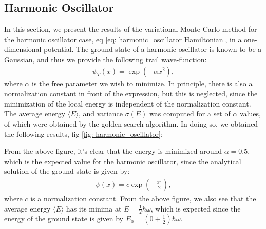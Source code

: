\documentclass[a4paper]{article}
\newcommand{\w}{\omega}
\newcommand{\average}[1]{\langle #1 \rangle}
\begin{document}
\subsection{Harmonic Oscillator}
In this section, we present the results of the variational Monte Carlo method for the harmonic oscillator case, eq \ref{eq: harmonic_oscillator Hamiltonian}, in a one-dimensional potential.
The ground state of a harmonic oscillator is known to be a Gaussian, and thus we provide the following trail wave-function:
\begin{align*}
    \psi_T(x) = \exp\left(-\alpha x^2\right),
\end{align*}where $\alpha$ is the free parameter we wish to minimize.
In principle, there is also a normalization constant in front of the expression, but this is neglected, since the minimization of the local energy is independent of the normalization constant.
The average energy $\average{E}$, and variance $\sigma(E)$ was computed for a set of $\alpha$ values, of which were obtained by the golden search algorithm.
In doing so, we obtained the following results, fig \ref{fig: harmonic_oscillator}:
\begin{figure}[H]
    \centering
\end{figure}\noindent
From the above figure, it's clear that the energy is minimized around $\alpha = 0.5$, which is the expected value for the harmonic oscillator, since the analytical solution of the ground-state is given by:
\begin{align*}
    \psi(x) = c \exp\left(-\frac{x^2}{2}\right),
\end{align*}where $c$ is a normalization constant. From the above figure, we also see that the average energy $\average{E}$ has its minima at $E = \frac{1}{2}\hbar\w$,
which is expected since the energy of the ground state is given by $E_0 = \left(0 + \frac{1}{2}\right)\hbar\w$.
\end{document}
